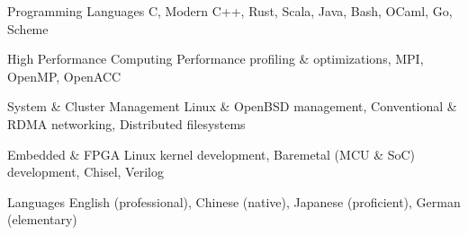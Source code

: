 

\begin{cvskills}

  \cvskill
    {Programming Languages} %
    {C, Modern C++, Rust, Scala, Java, Bash, OCaml, Go, Scheme} %

  \cvskill
    {High Performance Computing} %
    {Performance profiling \& optimizations, MPI, OpenMP, OpenACC} %

  \cvskill
    {System \& Cluster Management} %
    {Linux \& OpenBSD management, Conventional \& RDMA networking, Distributed filesystems} %

  \cvskill
    {Embedded \& FPGA}
    {Linux kernel development, Baremetal (MCU \& SoC) development, Chisel, Verilog}


  \cvskill
    {Languages} %
    {English (professional), Chinese (native), Japanese (proficient), German (elementary)} %

\end{cvskills}
